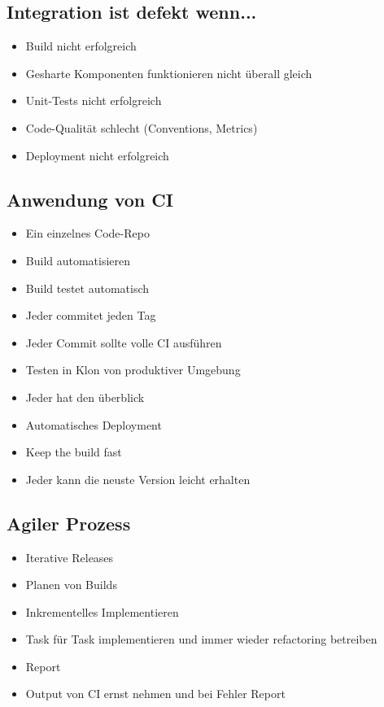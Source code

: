 \documentclass[a4paper,10pt]{article}
\begin{document}
\subsection{Integration ist defekt wenn...}
\begin{itemize}
 \item Build nicht erfolgreich
 \item Gesharte Komponenten funktionieren nicht \"uberall gleich
 \item Unit-Tests nicht erfolgreich
 \item Code-Qualit\"at schlecht (Conventions, Metrics)
 \item Deployment nicht erfolgreich
\end{itemize}

\subsection{Anwendung von CI}
\begin{itemize}
 \item Ein einzelnes Code-Repo
 \item Build automatisieren
 \item Build testet automatisch
 \item Jeder commitet jeden Tag
 \item Jeder Commit sollte volle CI ausf\"uhren
 \item Testen in Klon von produktiver Umgebung
 \item Jeder hat den \"uberblick
 \item Automatisches Deployment
 \item Keep the build fast
 \item Jeder kann die neuste Version leicht erhalten
\end{itemize}

\subsection{Agiler Prozess}
\begin{itemize}
 \item Iterative Releases
 \item Planen von Builds
 \item Inkrementelles Implementieren
 \item Task f\"ur Task implementieren und immer wieder refactoring betreiben
 \item Report
 \item Output von CI ernst nehmen und bei Fehler Report
\end{itemize}
\end{document}
